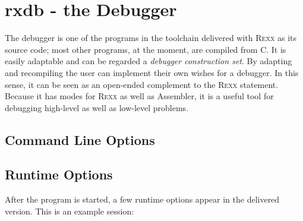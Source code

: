 \chapter{rxdb - the \crexx{} Debugger}\label{debugger}
The debugger is one of the programs in the toolchain delivered with \textsc{Rexx}
as its source code; most other programs, at the moment, are compiled
from C. It is easily adaptable and can be regarded a \emph{debugger
  construction set}. By adapting and recompiling the user can
implement their own wishes for a debugger. In this sense, it can be
seen as an open-ended complement to the \textsc{Rexx} 
statement. Because it has modes for \textsc{Rexx} as well as
 Assembler, it is a useful tool for debugging
high-level as well as low-level problems.
\section{Command Line Options}
\begin{shaded}
  \small
  \obeylines {}
 \end{shaded}
\section{Runtime Options}
After the  program is started, a few runtime options appear in the
delivered version. This is an example session:

